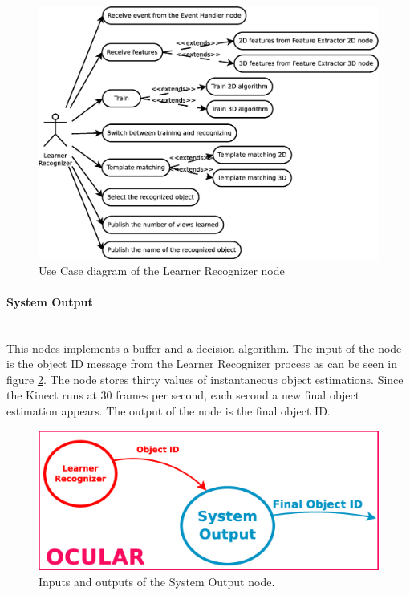 	\begin{figure}[H]
		\centering
			\includegraphics[scale=0.4]{img/diagrams/uc_learner_recognizer.eps}
			\caption[Use case diagram Learner Recognizer node]{Use Case diagram of the Learner Recognizer node}
			\label{uc_learner_recognizer}
	\end{figure}



\paragraph{System Output}\mbox{}\\

	This nodes implements a buffer and a decision algorithm. 
	The input of the node is the object ID message from the Learner Recognizer process as can be seen in figure \ref{node_output}.
	The node stores thirty values of instantaneous object estimations. 
	Since the Kinect runs at 30 frames per second, each second a new final object estimation appears. 
	The output of the node is the final object ID. 


		\begin{figure}[H]
			\begin{center}
			\includegraphics[width=0.5\linewidth]{img/diagrams/node_output.eps}
			\caption[System Output node I/O]{Inputs and outputs of the System Output node.}		
			\label{node_output}
			\end{center}
		\end{figure}

